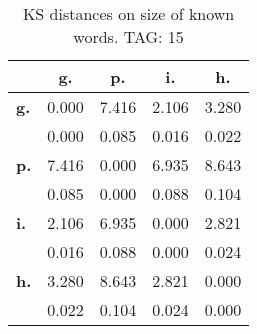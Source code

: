 \begin{table}[h!]
\begin{center}
\begin{tabular}{| l || c | c | c | c |}\hline
 & {\bf g.} & {\bf p.} & {\bf i.} & {\bf h.} \\\hline\hline
{\bf g.} & 0.000 & 7.416 & 2.106 & 3.280 \\
{\bf } & 0.000 & 0.085 & 0.016 & 0.022 \\\hline
{\bf p.} & 7.416 & 0.000 & 6.935 & 8.643 \\
{\bf } & 0.085 & 0.000 & 0.088 & 0.104 \\\hline
{\bf i.} & 2.106 & 6.935 & 0.000 & 2.821 \\
{\bf } & 0.016 & 0.088 & 0.000 & 0.024 \\\hline
{\bf h.} & 3.280 & 8.643 & 2.821 & 0.000 \\
{\bf } & 0.022 & 0.104 & 0.024 & 0.000 \\\hline
\end{tabular}
\caption{KS distances on size of known words. TAG: 15}
\end{center}
\end{table}